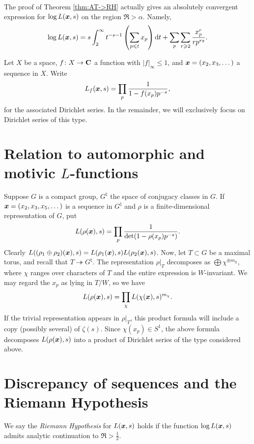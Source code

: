 The proof of Theorem \ref{thm:AT->RH} actually gives an absolutely 
convergent expression for $\log L({\boldsymbol x},s)$ on the region $\Re >\alpha$. Namely, 
\[
	\log L({\boldsymbol x},s) = s \int_2^\infty t^{-s-1}\left(\sum_{p\leqslant t} x_p\right) \mathrm{d} t + \sum_p \sum_{r\geqslant 2} \frac{x_p^r}{r p^{r s}} . 
\]

Let $X$ be a space, $f\colon X\to \mathbf{C}$ a function with 
$|f|_\infty\leqslant 1$, and ${\boldsymbol x}=(x_2,x_3,\dots)$ a sequence in $X$. Write 
\[
	L_f({\boldsymbol x},s) = \prod_p \frac{1}{1-f(x_p) p^{-s}} ,
\]
for the associated Dirichlet series. In the remainder, we will 
exclusively focus on Dirichlet series of this type. 





\section{Relation to automorphic and motivic \texorpdfstring{$L$}{L}-functions}

Suppose $G$ is a compact group, $G^\natural$ the space of conjugacy classes in 
$G$. If ${\boldsymbol x} = (x_2,x_3,x_5,\dots)$ is a sequence in $G^\natural$ and $\rho$ is 
a finite-dimensional representation of $G$, put 
\[
	L(\rho({\boldsymbol x}),s) = \prod_p \frac{1}{\det(1-\rho(x_p) p^{-s})} .
\]
Clearly $L((\rho_1\oplus \rho_2)({\boldsymbol x}),s) = L(\rho_1({\boldsymbol x}),s) L(\rho_2({\boldsymbol x}),s)$. 
Now, let $T\subset G$ be a maximal torus, and recall that 
$T\twoheadrightarrow G^\natural$. The representation 
$\left.\rho\right|_T$ decomposes as $\bigoplus \chi^{\oplus m_\chi}$, where 
$\chi$ ranges over characters of $T$ and the entire expression is 
$W$-invariant. We may regard the $x_p$ as lying in $T/W$, so we have 
\[
	L(\rho({\boldsymbol x}),s) = \prod_\chi L(\chi({\boldsymbol x}),s)^{m_\chi} .
\]
If the trivial representation appears in $\left.\rho\right|_T$, this product 
formula will include a copy (possibly several) of $\zeta(s)$. Since 
$\chi(x_p) \in S^1$, the above formula decomposes $L(\rho({\boldsymbol x}),s)$ into a 
product of Dirichlet series of the type considered above. 





\section{Discrepancy of sequences and the Riemann Hypothesis}

\begin{definition}
We say the \emph{Riemann Hypothesis} for $L({\boldsymbol x},s)$ holds if the function 
$\log L({\boldsymbol x},s)$ admits analytic continuation to $\Re > \frac 1 2$. 
\end{definition}

